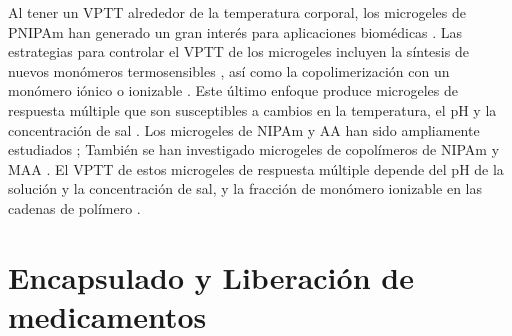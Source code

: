 Al tener un VPTT alrededor de la temperatura corporal, los microgeles de PNIPAm han generado un gran inter\'es para aplicaciones biom\'edicas \cite{Guan2011}.
Las estrategias para controlar el VPTT de los microgeles incluyen la s\'intesis de nuevos mon\'omeros termosensibles  \cite{Cai2007,Macchione2019}, as\'i como la copolimerizaci\'on con un mon\'omero i\'onico o ionizable  \cite{Hirose1987,Lopez2020}.
Este \'ultimo enfoque produce microgeles de respuesta m\'ultiple que son susceptibles a cambios en la temperatura, el pH y la concentraci\'on de sal  \cite{snowden1996colloidal, Farooqi2017}.
Los microgeles de NIPAm y AA han sido ampliamente estudiados \cite{Morris1997, Jones2000,Bradley2005,Begum2016};
Tambi\'en se han investigado microgeles de copol\'imeros de NIPAm y MAA  \cite{Dowding2000,Hoare2004,Giussi2015}.
El VPTT de estos microgeles de respuesta m\'ultiple depende del pH de la soluci\'on y la concentraci\'on de sal, y la fracci\'on de mon\'omero ionizable en las cadenas de pol\'imero  \cite{Morris1997,Jones2000, Hoare2004, Bradley2005, Lee2008,Wong2009,Hamzavi2016}.



\section{Encapsulado y Liberaci\'on de medicamentos}


